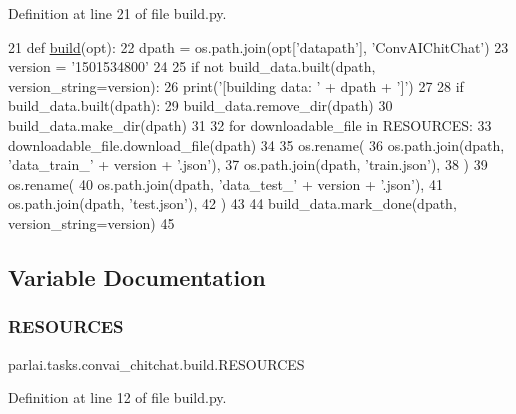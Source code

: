 Definition at line 21 of file build.\+py.


\begin{DoxyCode}
21 \textcolor{keyword}{def }\hyperlink{namespacedialog__babi__feedback_1_1build_a7a9d289f7493a5ded13c4b7f071b6184}{build}(opt):
22     dpath = os.path.join(opt[\textcolor{stringliteral}{'datapath'}], \textcolor{stringliteral}{'ConvAIChitChat'})
23     version = \textcolor{stringliteral}{'1501534800'}
24 
25     \textcolor{keywordflow}{if} \textcolor{keywordflow}{not} build\_data.built(dpath, version\_string=version):
26         print(\textcolor{stringliteral}{'[building data: '} + dpath + \textcolor{stringliteral}{']'})
27 
28         \textcolor{keywordflow}{if} build\_data.built(dpath):
29             build\_data.remove\_dir(dpath)
30         build\_data.make\_dir(dpath)
31 
32         \textcolor{keywordflow}{for} downloadable\_file \textcolor{keywordflow}{in} RESOURCES:
33             downloadable\_file.download\_file(dpath)
34 
35         os.rename(
36             os.path.join(dpath, \textcolor{stringliteral}{'data\_train\_'} + version + \textcolor{stringliteral}{'.json'}),
37             os.path.join(dpath, \textcolor{stringliteral}{'train.json'}),
38         )
39         os.rename(
40             os.path.join(dpath, \textcolor{stringliteral}{'data\_test\_'} + version + \textcolor{stringliteral}{'.json'}),
41             os.path.join(dpath, \textcolor{stringliteral}{'test.json'}),
42         )
43 
44         build\_data.mark\_done(dpath, version\_string=version)
45 \end{DoxyCode}


\subsection{Variable Documentation}
\mbox{\label{namespaceparlai_1_1tasks_1_1convai__chitchat_1_1build_a77291224078e3075ac0ebde14d3a558b}} 
\subsubsection{\texorpdfstring{R\+E\+S\+O\+U\+R\+C\+ES}{RESOURCES}}
{\footnotesize\ttfamily parlai.\+tasks.\+convai\+\_\+chitchat.\+build.\+R\+E\+S\+O\+U\+R\+C\+ES}



Definition at line 12 of file build.\+py.

